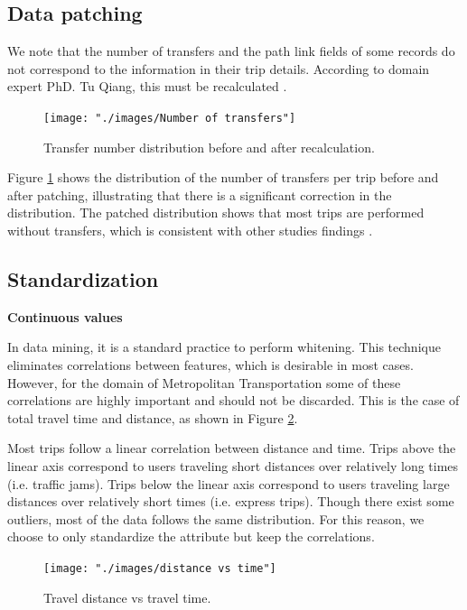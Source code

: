 \documentclass{article}
\begin{document}
\subsection{Data patching}
\label{sec:patching}
We note that the number of transfers and the path link fields of some records do not correspond to the information in their trip details. According to domain expert PhD. Tu Qiang, this must be recalculated \cite{tommy}. 

\begin{figure}[H]
  \centering
  \texttt{[image: "./images/Number of transfers"]}
  \caption{Transfer number distribution before and after recalculation.}
  \label{fig:preprocessing/num_transfers}
\end{figure}

Figure \ref{fig:preprocessing/num_transfers} shows the distribution of the number of transfers per trip before and after patching, illustrating that there is a significant correction in the distribution. The patched distribution shows that most trips are performed without transfers, which is consistent with other studies findings \cite{bhaskar2015passenger}.

\subsection{Standardization} 

\textbf{Continuous values}

In data mining, it is a standard practice to perform whitening. This technique eliminates correlations between features, which is desirable in most cases. However, for the domain of Metropolitan Transportation some of these correlations are highly important and should not be discarded. This is the case of total travel time and distance, as shown in Figure \ref{fig:preprocessing/distance_time_correlation}. 

Most trips follow a linear correlation between distance and time. Trips above the linear axis correspond to users traveling short distances over relatively long times (i.e. traffic jams). Trips below the linear axis correspond to users traveling large distances over relatively short times (i.e. express trips). Though there exist some outliers, most of the data follows the same distribution. For this reason, we choose to only standardize the attribute but keep the correlations. 

\begin{figure}[H]
  \centering
  \texttt{[image: "./images/distance vs time"]}
  \caption{Travel distance vs travel time.}
  \label{fig:preprocessing/distance_time_correlation}
\end{figure}
\end{document}
